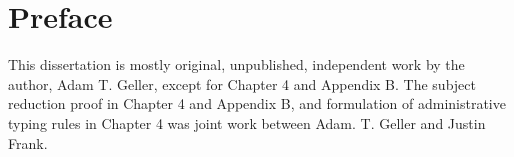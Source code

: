 \chapter{Preface}
This dissertation is mostly original, unpublished, independent work by the author, Adam T. Geller, except for Chapter 4 and Appendix B.
The subject reduction proof in Chapter 4 and Appendix B, and formulation of administrative typing rules in Chapter 4 was joint work between Adam. T. Geller and Justin Frank.